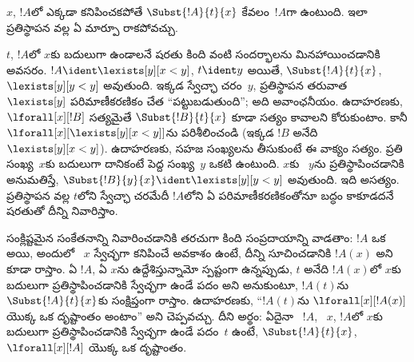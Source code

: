 \documentclass[../../../include/open-logic-section]{subfiles}
\begin{document}
\begin{explain}
$x$, $!A$లో ఎక్కడా కనిపించకపోతే $\Subst{!A}{t}{x}$ కేవలం~$!A$గా
ఉంటుంది. ఇలా ప్రతిస్థాపన వల్ల ఏ మార్పూ రాకపోవచ్చు.

$t$, $!A$లో $x$కు బదులుగా  ఉండాలనే షరతు కింది వంటి సందర్భాలను
మినహాయించడానికి అవసరం. $!A \ident \lexists[y][x < y]$, $t \ident y$
అయితే, $\Subst{!A}{t}{x}$, $\lexists[y][y < y]$ అవుతుంది. ఇక్కడ
స్వేచ్ఛా చరం~$y$, ప్రతిస్థాపన తరువాత $\lexists[y]$ పరిమాణీకరణికం చేత
``పట్టుబడుతుంది''; అది అవాంఛనీయం. ఉదాహరణకు,
$\lforall[x][!B]$ సత్యమైతే $\Subst{!B}{t}{x}$ కూడా సత్యం కావాలని
కోరుకుంటాం. కానీ $\lforall[x][\lexists[y][x < y]]$ను పరిశీలించండి
(ఇక్కడ $!B$ అనేది $\lexists[y][x < y]$). ఉదాహరణకు, సహజ సంఖ్యలను
తీసుకుంటే ఈ వాక్యం సత్యం. ప్రతి సంఖ్య~$x$కు బదులుగా దానికంటే పెద్ద సంఖ్య~$y$ ఒకటి ఉంటుంది. $x$కు
~$y$ను ప్రతిస్థాపించడానికి అనుమతిస్తే,
$\Subst{!B}{y}{x} \ident \lexists[y][y < y]$ అవుతుంది. ఇది అసత్యం.
ప్రతిస్థాపన వల్ల $t$లోని స్వేచ్ఛా చరమేదీ $!A$లోని ఏ పరిమాణీకరణికంతోనూ
బద్ధం కాకూడదనే షరతుతో దీన్ని నివారిస్తాం.
\end{explain}

సంక్లిష్టమైన సంకేతనాన్ని నివారించడానికి తరచుగా కింది సంప్రదాయాన్ని
వాడతాం: $!A$ ఒక  అయి, అందులో ~$x$ స్వేచ్ఛగా
కనిపించే అవకాశం ఉంటే, దీన్ని
సూచించడానికి $!A(x)$ అని కూడా రాస్తాం. ఏ $!A$, ఏ $x$ను ఉద్దేశిస్తున్నామో
స్పష్టంగా ఉన్నప్పుడు, $t$ అనేది $!A(x)$లో $x$కు బదులుగా ప్రతిస్థాపించడానికి స్వేచ్ఛగా ఉండే పదం అని
అనుకుంటూ, $!A(t)$ను $\Subst{!A}{t}{x}$కు సంక్షిప్తంగా రాస్తాం. ఉదాహరణకు,
``$!A(t)$ను $\lforall[x][!A(x)]$ యొక్క ఒక దృష్టాంతం అంటాం'' అని
చెప్పవచ్చు. దీని అర్థం: ఏదైనా ~$!A$, ~$x$,
$!A$లో $x$కు బదులుగా ప్రతిస్థాపించడానికి స్వేచ్ఛగా ఉండే పదం~$t$ ఉంటే,
$\Subst{!A}{t}{x}$, $\lforall[x][!A]$ యొక్క ఒక దృష్టాంతం.
\end{document}
